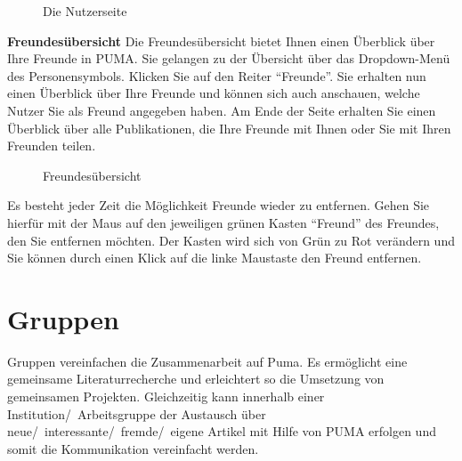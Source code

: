 \begin{figure}[h!]
 \centering
 \caption{Die Nutzerseite}
 \label{fig:nutzerseite}
\end{figure}
\textbf{Freundesübersicht} \newline
Die Freundesübersicht bietet Ihnen einen Überblick über Ihre Freunde in PUMA. Sie gelangen zu der Übersicht über das Dropdown-Menü des Personensymbols. Klicken Sie auf den Reiter \enquote{Freunde}. Sie erhalten nun einen Überblick über Ihre Freunde und können sich auch anschauen, welche Nutzer Sie als Freund angegeben haben. Am Ende der Seite erhalten Sie einen Überblick über alle Publikationen, die Ihre Freunde mit Ihnen oder Sie mit Ihren Freunden teilen.\newline
\begin{figure}[h!]
 \centering
 \caption{Freundesübersicht}
 \label{fig:freundesuebersicht}
\end{figure}
Es besteht jeder Zeit die Möglichkeit Freunde wieder zu entfernen. Gehen Sie hierfür mit der Maus auf den jeweiligen grünen Kasten \enquote{Freund} des Freundes, den Sie entfernen möchten. Der Kasten wird sich von Grün zu Rot verändern und Sie können durch einen Klick auf die linke Maustaste den Freund entfernen. 
\section{Gruppen}
\label{sec:gruppen}
Gruppen vereinfachen die Zusammenarbeit auf Puma. Es ermöglicht eine gemeinsame Literaturrecherche und erleichtert so die Umsetzung von gemeinsamen Projekten. Gleichzeitig kann innerhalb einer Institution/~Arbeitsgruppe der Austausch über neue/~interessante/~fremde/~eigene Artikel mit Hilfe von PUMA erfolgen und somit die Kommunikation vereinfacht werden. 

